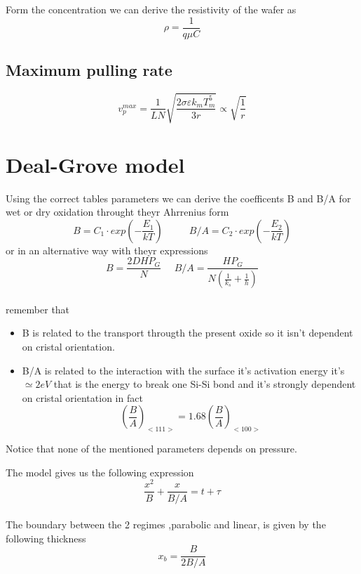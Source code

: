 Form the concentration we can derive the resistivity of the wafer as
\begin{equation}
\rho=\frac{1}{q\mu C}
\end{equation}

\subsection{Maximum pulling rate}
\begin{equation}
v_p^{max}=\frac{1}{LN}\sqrt{\frac{2\sigma \varepsilon k_m T_m^5}{3r}}\propto \sqrt{\frac{1}{r}}
\end{equation}


\section{Deal-Grove model}
Using the correct tables parameters we can derive the coefficents B and B/A for wet or dry oxidation throught theyr Ahrrenius form 
\begin{equation}
B=C_1\cdot exp\left(-\frac{E_1}{kT} \right) \ \ \ \ \ \ \ \ \ \ \ \ B/A=C_2\cdot exp\left(-\frac{E_2}{kT} \right)
\end{equation}
or in an alternative way with theyr expressions
\begin{equation}
B=\frac{2DHP_G}{N} \ \ \ \ \ \ B/A=\frac{HP_G}{N \left( \frac{1}{k_s}+\frac{1}{h}  \right) }
\end{equation}
\\
remember that 
\begin{itemize}
\item B is related to the transport througth the present oxide so it isn't dependent on cristal orientation.
\item B/A is related to the interaction with the surface it's activation energy it's $\simeq 2eV$ that is the energy to break one Si-Si bond and it's strongly dependent on cristal orientation in fact
\begin{equation}
\left(\frac{B}{A}\right)_{<111>}=1.68\left(\frac{B}{A}\right)_{<100>}
\end{equation}
\end{itemize}
Notice that none of the mentioned parameters depends on pressure.\\

\vspace{5mm}

The model gives us the following expression
\begin{equation}
\frac{x^2}{B}+\frac{x}{B/A}=t+\tau
\end{equation}
\\
The boundary between the 2 regimes ,parabolic and linear, is given by the following thickness
\begin{equation}
x_b=\frac{B}{2B/A}
\end{equation}
\\
\vspace{5mm}

